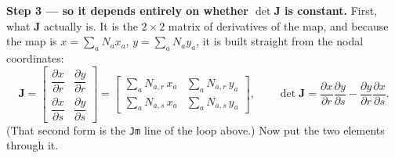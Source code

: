 \documentclass[11pt]{article}
\begin{document}
\medskip
\noindent
\textbf{Step 3 --- so it depends entirely on whether $\det\bm{J}$ is constant.}
First, what $\bm{J}$ actually is. It is the $2\times2$ matrix of derivatives of
the map, and because the map is $x=\sum_{a}N_{a}x_{a}$, $y=\sum_{a}N_{a}y_{a}$,
it is built straight from the nodal coordinates:
\begin{equation}\label{eq:Jdef}
  \bm{J}=
  \begin{bmatrix}
    \dfrac{\partial x}{\partial r} & \dfrac{\partial y}{\partial r}\\[10pt]
    \dfrac{\partial x}{\partial s} & \dfrac{\partial y}{\partial s}
  \end{bmatrix}
  =\begin{bmatrix}
    \sum_{a}N_{a,r}\,x_{a} & \sum_{a}N_{a,r}\,y_{a}\\[4pt]
    \sum_{a}N_{a,s}\,x_{a} & \sum_{a}N_{a,s}\,y_{a}
  \end{bmatrix},
  \qquad
  \det\bm{J}=\frac{\partial x}{\partial r}\frac{\partial y}{\partial s}
            -\frac{\partial y}{\partial r}\frac{\partial x}{\partial s} .
\end{equation}
(That second form is the \texttt{Jm} line of the loop above.) Now put the two
elements through it.
\end{document}

